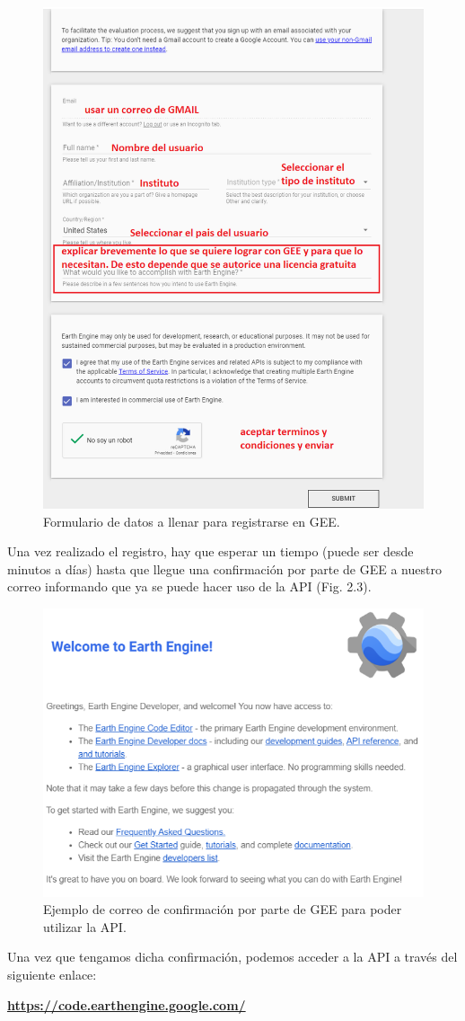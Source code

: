 \documentclass[
  12pt,
  letterpaper,
  twoside]{book}
\begin{document}
\begin{figure}[btp]

{\centering \includegraphics[width=0.4\linewidth]{Img/formulario} 

}

\caption{Formulario de datos a llenar para registrarse en GEE.}\label{fig:unnamed-chunk-3}
\end{figure}

Una vez realizado el registro, hay que esperar un tiempo (puede ser desde minutos a días) hasta que llegue una confirmación por parte de GEE a nuestro correo informando que ya se puede hacer uso de la API (Fig. 2.3).

\begin{figure}[btp]

{\centering \includegraphics[width=0.6\linewidth]{Img/correo} 

}

\caption{Ejemplo de correo de confirmación por parte de GEE para poder utilizar la API.}\label{fig:unnamed-chunk-4}
\end{figure}

Una vez que tengamos dicha confirmación, podemos acceder a la API a través del siguiente enlace:

\textbf{\url{https://code.earthengine.google.com/}}
\end{document}
